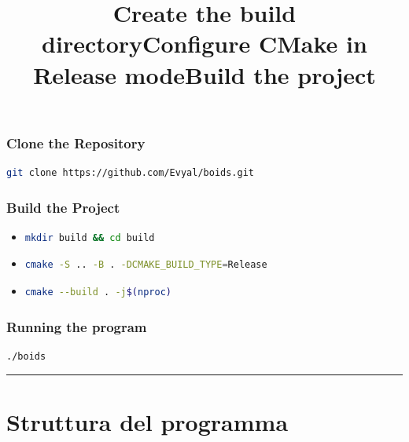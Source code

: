 \documentclass[10pt,a4paper]{article}
\begin{document}
\subsubsection{Clone the Repository}

\begin{lstlisting}[style=codecolour, language=bash]
git clone https://github.com/Evyal/boids.git
\end{lstlisting}

\subsubsection{Build the Project}

\begin{itemize}
    \item \title{\textbf{Create the build directory}}

\begin{lstlisting}[style=codecolour, language=bash]
mkdir build && cd build
\end{lstlisting}

\item \title{\textbf{Configure CMake in Release mode}}

\begin{lstlisting}[style=codecolour, language=bash]
cmake -S .. -B . -DCMAKE_BUILD_TYPE=Release
\end{lstlisting}

\item \title{\textbf{Build the project}} 

\begin{lstlisting}[style=codecolour, language=bash]
cmake --build . -j$(nproc)
\end{lstlisting}
\end{itemize}


\subsubsection{Running the program} 

\begin{lstlisting}[style=codecolour, language=bash]
./boids
\end{lstlisting}

\par\noindent\rule{\textwidth}{0.4pt}

\newpage

\section{Struttura del programma}
\end{document}
